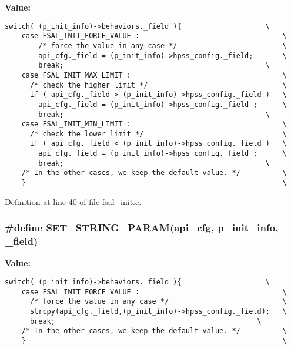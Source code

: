 \textbf{Value:}

\begin{Code}\begin{verbatim}switch( (p_init_info)->behaviors._field ){                    \
    case FSAL_INIT_FORCE_VALUE :                                  \
        /* force the value in any case */                         \
        api_cfg._field = (p_init_info)->hpss_config._field;       \
        break;                                                \
    case FSAL_INIT_MAX_LIMIT :                                    \
      /* check the higher limit */                                \
      if ( api_cfg._field > (p_init_info)->hpss_config._field )   \
        api_cfg._field = (p_init_info)->hpss_config._field ;      \
        break;                                                \
    case FSAL_INIT_MIN_LIMIT :                                    \
      /* check the lower limit */                                 \
      if ( api_cfg._field < (p_init_info)->hpss_config._field )   \
        api_cfg._field = (p_init_info)->hpss_config._field ;      \
        break;                                                \
    /* In the other cases, we keep the default value. */          \
    }                                                             \
\end{verbatim}
\end{Code}


Definition at line 40 of file fsal\_\-init.c.
\subsubsection[{SET\_\-STRING\_\-PARAM}]{\setlength{\rightskip}{0pt plus 5cm}\#define SET\_\-STRING\_\-PARAM(api\_\-cfg, \/  p\_\-init\_\-info, \/  \_\-field)}\label{fsal__init_8c_7e81fe711a5c74c6137e9ee255672ff7}


\textbf{Value:}

\begin{Code}\begin{verbatim}switch( (p_init_info)->behaviors._field ){                    \
    case FSAL_INIT_FORCE_VALUE :                                  \
      /* force the value in any case */                           \
      strcpy(api_cfg._field,(p_init_info)->hpss_config._field);   \
      break;                                                \
    /* In the other cases, we keep the default value. */          \
    }                                                             \
\end{verbatim}
\end{Code}


